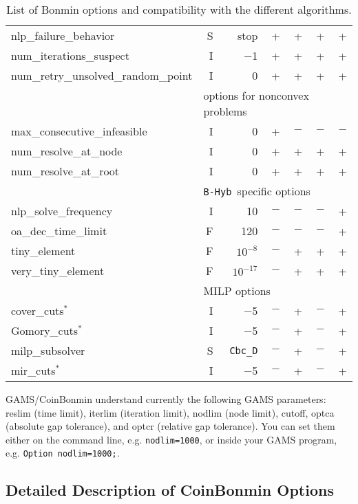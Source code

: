 \begin{table}[!ht]
\begin{center}
\begin{tabular}{|l|r|r|r|r|r|r|}
nlp\_failure\_behavior & S & stop   & + & + & + & + \\
num\_iterations\_suspect & I & $-$1 & + & + & + & + \\
num\_retry\_unsolved\_random\_point & I & 0 & + & + & + & + \\
\hline
\multicolumn{1}{|c}{} & \multicolumn{6}{l|}{options for nonconvex problems}\\
\hline
max\_consecutive\_infeasible & I & 0 & + & $-$ & $-$ & $-$\\
num\_resolve\_at\_node & I & 0 & + & +  & + & + \\
num\_resolve\_at\_root & I & 0& + & + & + & +  \\
\hline
\multicolumn{1}{|c}{} & \multicolumn{6}{l|}{{\tt B-Hyb }specific options}\\
\hline
nlp\_solve\_frequency & I & 10 & $-$ & $-$ & $-$ & +\\
oa\_dec\_time\_limit & F& 120 & $-$ & $-$ & $-$ & +\\
tiny\_element & F & $10^{-8}$ & $-$ & + & + & + \\
very\_tiny\_element & F & $10^{-17}$ & $-$ & + & + & + \\
\hline
\multicolumn{1}{|c}{} & \multicolumn{6}{l|}{MILP options}\\
\hline
cover\_cuts$^*$  & I & $-$5 & $-$ & + & $-$ & +\\
Gomory\_cuts$^*$ & I & $-$5 & $-$ &  + & $-$ & + \\
milp\_subsolver &S & {\tt Cbc\_D} & $-$ & + & $-$ & + \\
mir\_cuts$^*$  & I & $-$5 & $-$  & + & $-$ &+\\
\hline
\end{tabular}
\end{center}
\caption{\label{tab:bonminoptions}List of Bonmin options and compatibility with the different algorithms.}
\end{table}

GAMS/CoinBonmin understand currently the following GAMS parameters: reslim (time limit), iterlim (iteration limit), nodlim (node limit), cutoff, optca (absolute gap tolerance), and optcr (relative gap tolerance).
You can set them either on the command line, e.g. \verb+nodlim=1000+, or inside your GAMS program, e.g. \verb+Option nodlim=1000;+.

\subsection{Detailed Description of CoinBonmin Options}
\label{sub:bonminoptions}

